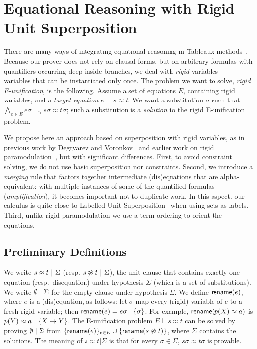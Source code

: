 
\section{Equational Reasoning with Rigid Unit Superposition}
\label{sec:rusuper}

There are many ways of integrating equational reasoning in Tableaux
methods~\cite{brand1975proving,letz2002integration,backeman2015theorem,degtyarev1996you}.
Because our prover does not rely on clausal forms, but on arbitrary formulas
with quantifiers occurring deep inside branches, we deal with {\em rigid}
variables --- variables that can be instantiated only once. The problem we want
to solve, {\em rigid E-unification}, is the following. Assume a set of equations
$E$, containing rigid variables, and a {\em target equation} $e = s \approx
t$. We want a substitution $\sigma$ such that $\bigwedge_{e \in E} e\sigma
\vdash_\approx s\sigma \approx t\sigma$; such a substitution is a {\em solution}
to the rigid E-unification problem.

We propose here an approach based on superposition with rigid variables, as in
previous work by Degtyarev and Voronkov~\cite{degtyarev1996you} and earlier work
on rigid paramodulation~\cite{plaisted1995special}, but with significant
differences. First, to avoid constraint solving, we do not use basic
superposition nor constraints. Second, we introduce a {\em merging} rule that
factors together intermediate (dis)equations that are alpha-equivalent: with
multiple instances of some of the quantified formulas ({\em amplification}), it
becomes important not to duplicate work. In this aspect, our calculus is quite
close to Labelled Unit Superposition~\cite{iprover_eq_labelled_unit_sup} when
using sets as labels. Third, unlike rigid paramodulation we use a term ordering
to orient the equations.

\subsection{Preliminary Definitions}

We write $  s \approx t  ~|~  \Sigma$
(resp. $  s \not\approx t  ~|~  \Sigma$),
the unit clause that contains exactly one equation (resp.~disequation)
under hypothesis $\Sigma$ (which is a set of substitutions).
We write $\emptyset ~|~ \Sigma$ for the empty clause under hypothesis $\Sigma$.
We define $\textsf{rename}(e)$, where $e$ is a (dis)equation, as follows:
let $\sigma$ map every (rigid) variable of $e$ to a fresh rigid variable;
then $\textsf{rename}(e) =  e\sigma  ~|~  \{ \sigma \} $.
For example, $\textsf{rename}(p(X)\approx a)$
is $ p(Y)\approx a ~|~  \{ X\mapsto Y\} $. %
The E-unification problem $E \vdash s\approx t$ can be solved by
proving $\emptyset  ~|~  \Sigma$
from $\{ \textsf{rename}(e) \}_{ e \in E }
\cup
\{ \textsf{rename}( s \not\approx t ) \}$,
where $\Sigma$ contains the solutions.
The meaning of $s \approx t | \Sigma$ is that for every $\sigma \in \Sigma$,
$s\sigma \approx t\sigma$ is provable.

